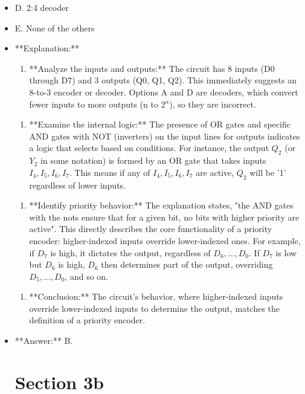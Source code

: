 \documentclass{article}
\begin{document}
\begin{itemize}
    \item D. 2:4 decoder

    \item E. None of the others

\item **Explanation:**

    \begin{enumerate}
\item **Analyze the inputs and outputs:** The circuit has 8 inputs (D0 through D7) and 3 outputs (Q0, Q1, Q2). This immediately suggests an 8-to-3 encoder or decoder. Options A and D are decoders, which convert fewer inputs to more outputs (n to 2$^n$), so they are incorrect.

\end{enumerate}
    \begin{enumerate}
\item **Examine the internal logic:** The presence of OR gates and specific AND gates with NOT (inverters) on the input lines for outputs indicates a logic that selects based on conditions. For instance, the output $Q_2$ (or $Y_2$ in some notation) is formed by an OR gate that takes inputs $I_4, I_5, I_6, I_7$. This means if any of $I_4, I_5, I_6, I_7$ are active, $Q_2$ will be '1' regardless of lower inputs.

\end{enumerate}
    \begin{enumerate}
\item **Identify priority behavior:** The explanation states, "the AND gates with the nots ensure that for a given bit, no bits with higher priority are active". This directly describes the core functionality of a priority encoder: higher-indexed inputs override lower-indexed ones. For example, if $D_7$ is high, it dictates the output, regardless of $D_6, \dots, D_0$. If $D_7$ is low but $D_6$ is high, $D_6$ then determines part of the output, overriding $D_5, \dots, D_0$, and so on.

\end{enumerate}
    \begin{enumerate}
\item **Conclusion:** The circuit's behavior, where higher-indexed inputs override lower-indexed inputs to determine the output, matches the definition of a priority encoder.

\end{enumerate}
\item **Answer:** B.


\section{Section 3b}


\end{itemize}
\end{document}
